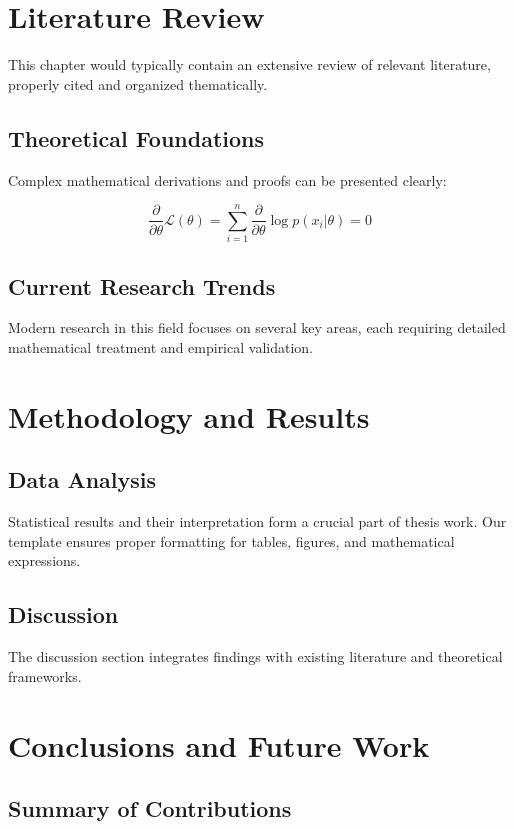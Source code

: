 \documentclass[12pt]{e_class_thesis}
\begin{document}
\chapter{Literature Review}

This chapter would typically contain an extensive review of relevant literature, properly cited and organized thematically.

\section{Theoretical Foundations}

Complex mathematical derivations and proofs can be presented clearly:

$$\frac{\partial}{\partial \theta} \mathcal{L}(\theta) = \sum_{i=1}^{n} \frac{\partial}{\partial \theta} \log p(x_i|\theta) = 0$$

\section{Current Research Trends}

Modern research in this field focuses on several key areas, each requiring detailed mathematical treatment and empirical validation.

\chapter{Methodology and Results}

\section{Data Analysis}

Statistical results and their interpretation form a crucial part of thesis work. Our template ensures proper formatting for tables, figures, and mathematical expressions.

\section{Discussion}

The discussion section integrates findings with existing literature and theoretical frameworks.

\chapter{Conclusions and Future Work}

\section{Summary of Contributions}
\end{document}
